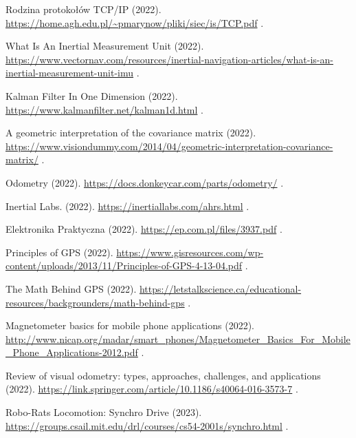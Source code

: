 \begin{thebibliography}{99}
    {Rodzina protokołów TCP/IP} (2022).
    \newblock \url{https://home.agh.edu.pl/~pmarynow/pliki/siec/is/TCP.pdf}
    \newblock [Accessed: 04/01/2023].

    {What Is An Inertial Measurement Unit} (2022).
    \newblock \url{https://www.vectornav.com/resources/inertial-navigation-articles/what-is-an-inertial-measurement-unit-imu}
    \newblock [Accessed: 05/01/2023].

    {Kalman Filter In One Dimension} (2022).
    \newblock \url{https://www.kalmanfilter.net/kalman1d.html}
    \newblock [Accessed: 06/01/2023].

    {A geometric interpretation of the covariance matrix} (2022).
    \newblock \url{https://www.visiondummy.com/2014/04/geometric-interpretation-covariance-matrix/}
    \newblock [Accessed: 07/01/2023].

    {Odometry} (2022).
    \newblock \url{https://docs.donkeycar.com/parts/odometry/}
    \newblock [Accessed: 08/01/2023].

    {Inertial Labs.} (2022).
    \newblock \url{https://inertiallabs.com/ahrs.html}
    \newblock [Accessed: 09/01/2023].

    {Elektronika Praktyczna} (2022).
    \newblock \url{https://ep.com.pl/files/3937.pdf}
    \newblock [Accessed: 10/01/2023].

    {Principles of GPS} (2022).
    \newblock \url{https://www.gisresources.com/wp-content/uploads/2013/11/Principles-of-GPS-4-13-04.pdf}
    \newblock [Accessed: 11/01/2023].

    {The Math Behind GPS} (2022).
    \newblock \url{https://letstalkscience.ca/educational-resources/backgrounders/math-behind-gps}
    \newblock [Accessed: 12/01/2023].

    {Magnetometer basics for mobile phone applications} (2022).
    \newblock \url{http://www.nicap.org/madar/smart_phones/Magnetometer_Basics_For_Mobile_Phone_Applications-2012.pdf}
    \newblock [Accessed: 13/01/2023].

    {Review of visual odometry: types, approaches, challenges, and applications} (2022).
    \newblock \url{https://link.springer.com/article/10.1186/s40064-016-3573-7}
    \newblock [Accessed: 14/01/2023].

    {Robo-Rats Locomotion: Synchro Drive} (2023).
    \newblock \url{https://groups.csail.mit.edu/drl/courses/cs54-2001s/synchro.html}
    \newblock [Accessed: 15/01/2023].
\end{thebibliography}

